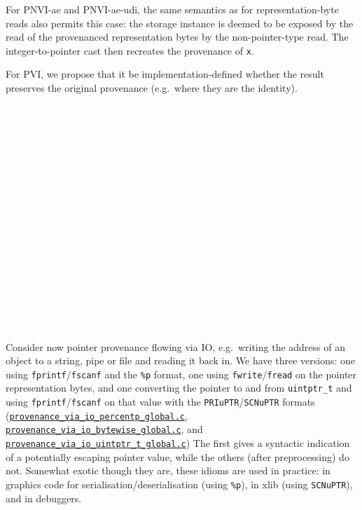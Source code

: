 \documentclass[acmsmall,review,screen]{acmart}\settopmatter{printfolios=true,printccs=false,printacmref=false}
\newcommand{\myparagraph}[1]{\vspace{0.5\baselineskip}\par\noindent{\normalsize\bfseries{#1}}\quad}
\newcommand{\mytesturl}[1]{https://cerberus.cl.cam.ac.uk/cerberus?defacto/#1}
\newcommand{\mytestlink}[2]{\href{\mytesturl{#1}}{#2}}
\newcommand{\mylsttestlink}[1]{\mytestlink{#1}{\lstinline{#1}}}
\newcommand{\mylistingmargin}{5mm}
\newcommand{\myqtlinkexample}[4]{{\vspace*{-0.5\baselineskip}\par{\noindent\small\hspace*{\mylistingmargin}\lstinline{//} #4\vspace*{-0.25\baselineskip}}}}
\newcommand{\myqtexample}[3]{\myqtlinkexample{#1}{#2}{#3}{{\mylsttestlink{#2}}}}
\newcommand{\myfooexamplename}[1]{\mylsttestlink{#1}}
\begin{document}
For PNVI-ae and PNVI-ae-udi, 
the same semantics as for representation-byte reads 
also permits this case: the storage instance 
is deemed to be exposed by the read of the provenanced
representation bytes by the non-pointer-type read.
The integer-to-pointer cast then recreates the provenance of
\lstinline{x}. 

For PVI, we propose that it be
implementation-defined whether the result preserves the original
provenance (e.g.~where they are the identity).

\

\

\

\

\


\

\

\

\

\



\myparagraph{Pointer provenance via IO}
Consider now pointer provenance flowing 
via IO, e.g.~writing the address of an object to a string, pipe or file and reading it
back in.
We have three versions: one using \lstinline{fprintf}/\lstinline{fscanf} and
the \lstinline{%p} format, one using \lstinline{fwrite}/\lstinline{fread} on
the pointer representation bytes, and one converting the pointer to
and from \lstinline{uintptr_t} and using
\lstinline{fprintf}/\lstinline{fscanf} on that value with the
\lstinline{PRIuPTR}/\lstinline{SCNuPTR} formats
(\myfooexamplename{provenance_via_io_percentp_global.c},
\myfooexamplename{provenance_via_io_bytewise_global.c}, and
\myfooexamplename{provenance_via_io_uintptr_t_global.c})
The first gives a syntactic indication of a potentially
escaping pointer value, while the others (after preprocessing) do
not. 
%
%
Somewhat exotic though they are, these idioms are used in practice: in 
graphics code for
serialisation/deserialisation (using \lstinline{%p}), 
in xlib (using \lstinline{SCNuPTR}), and in debuggers.
\end{document}
